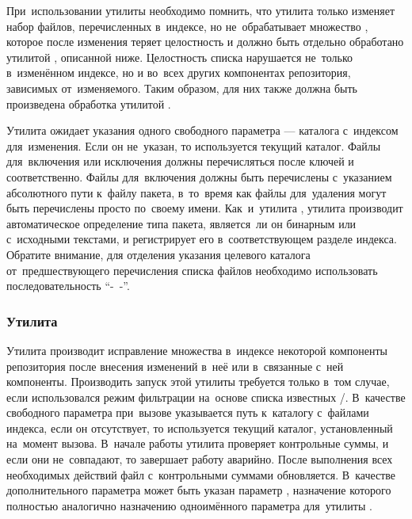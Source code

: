 При~использовании утилиты  необходимо помнить, что утилита только изменяет набор файлов, перечисленных в~индексе, но не~обрабатывает множество \provides,
которое после изменения теряет целостность и должно быть отдельно обработано утилитой , описанной ниже.
Целостность списка \provides нарушается не~только в~изменённом индексе, но и во~всех других компонентах репозитория,
зависимых от~изменяемого.
Таким образом, для них также должна быть произведена обработка утилитой .

Утилита  ожидает указания одного свободного параметра --- каталога с~индексом для~изменения.
Если он не~указан, то используется текущий каталог.
Файлы для~включения или исключения должны перечисляться после ключей  и  соответственно.
Файлы для~включения должны быть  перечислены с~указанием абсолютного пути к~файлу пакета, 
в~то~время как файлы для~удаления могут быть перечислены просто по~своему имени.
Как~и~утилита , утилита  производит автоматическое определение типа пакета,
является~ли он бинарным или с~исходными текстами,
и регистрирует его в~соответствующем разделе индекса.
Обратите внимание, для отделения указания целевого каталога от~предшествующего перечисления  списка файлов необходимо использовать последовательность ``-~-''.

\subsubsection{Утилита }

Утилита  производит исправление множества \provides в~индексе некоторой компоненты репозитория после внесения изменений в~неё 
или в~связанные с~ней компоненты.
Производить запуск этой утилиты требуется только в~том случае, если использовался режим фильтрации \provides на~основе списка известных \requires/\conflicts.
В~качестве свободного параметра при~вызове указывается  путь к~каталогу с~файлами индекса,
если он отсутствует, то используется текущий каталог, установленный на~момент вызова.
В~начале работы утилита  проверяет   контрольные суммы, и если они не~совпадают, то завершает работу аварийно.
После выполнения всех необходимых действий файл с~контрольными суммами обновляется.
В~качестве дополнительного параметра может быть указан параметр , 
назначение которого полностью аналогично назначению одноимённого параметра для~утилиты .
